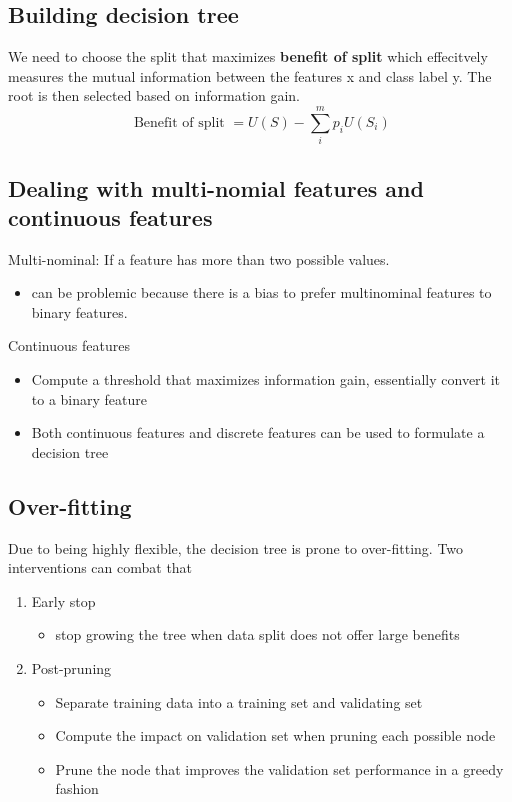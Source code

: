 \documentclass[11pt]{article}
\begin{document}
\subsection{Building decision tree}
\label{sec:org306ebf2}
We need to choose the split that maximizes \textbf{\textbf{benefit of split}} which effecitvely measures the mutual information between the features x and class label y. The root is then selected based on information gain.  
$$
\text{ Benefit of split } = U ( S ) - \sum _ { i } ^ { m } p _ { i } U \left( S _ { i } \right)
$$
\subsection{Dealing with multi-nomial features  and continuous features}
\label{sec:org0ad525a}
Multi-nominal: If a feature has more than two possible values. 
\begin{itemize}
\item can be problemic because there is a bias to prefer multinominal features to binary features.
\end{itemize}

Continuous features
\begin{itemize}
\item Compute a threshold that maximizes information gain, essentially convert it to a binary feature
\item Both continuous features and discrete features can be used to formulate a decision tree
\end{itemize}

\subsection{Over-fitting}
\label{sec:org3795ac1}
Due to being highly flexible, the decision tree is prone to over-fitting. Two interventions can combat that
\begin{enumerate}
\item Early stop
\begin{itemize}
\item stop growing the tree when data split does not offer large benefits
\end{itemize}
\item Post-pruning
\begin{itemize}
\item Separate training data into a training set and validating set
\item Compute the impact on validation set when pruning each possible node
\item Prune the node that improves the validation set performance in a greedy fashion
\end{itemize}
\end{enumerate}
\end{document}
